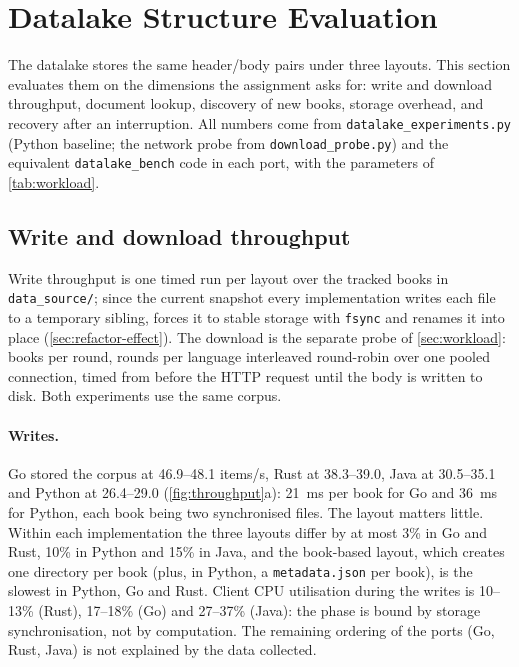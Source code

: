 \section{Datalake Structure Evaluation}
\label{sec:datalake}

The datalake stores the same header/body pairs under three layouts. This
section evaluates them on the dimensions the assignment asks for: write and
download throughput, document lookup, discovery of new books, storage
overhead, and recovery after an interruption. All numbers come from
\texttt{datalake\_experiments.py} (Python baseline; the network probe from
\texttt{download\_probe.py}) and the equivalent
\texttt{datalake\_bench} code in each port, with the parameters of
\cref{tab:workload}.

\subsection{Write and download throughput}
\label{sec:datalake-throughput}

Write throughput is one timed run per layout over the  tracked
books in \texttt{data\_source/}; since the current snapshot every
implementation writes each file to a temporary sibling, forces it to stable
storage with \texttt{fsync} and renames it into place
(\cref{sec:refactor-effect}). The download is the separate probe of
\cref{sec:workload}:  books per round,  rounds per
language interleaved round-robin over one pooled connection, timed from
before the HTTP request until the body is written to disk. Both experiments
use the same corpus.

\paragraph{Writes.}
Go stored the corpus at 46.9--48.1 items/s, Rust at 38.3--39.0, Java at
30.5--35.1 and Python at 26.4--29.0 (\cref{fig:throughput}a): 21~ms per book
for Go and 36~ms for Python, each book being two synchronised files. The
layout matters little. Within each implementation the three layouts differ
by at most 3\% in Go and Rust, 10\% in Python and 15\% in Java, and the
book-based layout, which creates one directory per book (plus, in Python, a
\texttt{metadata.json} per book), is the slowest in Python, Go and Rust.
Client CPU utilisation during the writes is 10--13\% (Rust), 17--18\% (Go)
and 27--37\% (Java): the phase is bound by storage synchronisation, not by
computation. The remaining ordering of the ports (Go, Rust, Java) is not
explained by the data collected.

